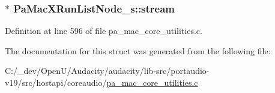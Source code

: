 \subsubsection[{\texorpdfstring{stream}{stream}}]{$\ast$ Pa\+Mac\+X\+Run\+List\+Node\+\_\+s\+::stream}\hypertarget{struct_pa_mac_x_run_list_node__s_a53f8dd20a19188e55a2f979917f24d80}{}\label{struct_pa_mac_x_run_list_node__s_a53f8dd20a19188e55a2f979917f24d80}


Definition at line 596 of file pa\+\_\+mac\+\_\+core\+\_\+utilities.\+c.



The documentation for this struct was generated from the following file\+:\begin{DoxyCompactItemize}
\item 
C\+:/\+\_\+dev/\+Open\+U/\+Audacity/audacity/lib-\/src/portaudio-\/v19/src/hostapi/coreaudio/\hyperlink{pa__mac__core__utilities_8c}{pa\+\_\+mac\+\_\+core\+\_\+utilities.\+c}\end{DoxyCompactItemize}
